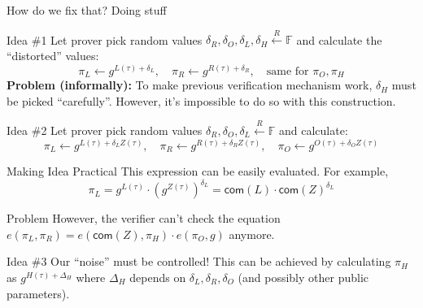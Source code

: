 \documentclass{zkdl-presentation-template}
\begin{document}
    \begin{frame}{How do we fix that? Doing stuff}
        \begin{block}{Idea \#1}
            Let prover pick random values $\delta_R, \delta_O, \delta_L, \delta_H \xleftarrow{R} \mathbb{F}$ and calculate the ``distorted'' values:
            \begin{equation*}
                \pi_L \gets g^{L(\tau) + \delta_L}, \quad \pi_R \gets g^{R(\tau) + \delta_R}, \quad \text{same for $\pi_O, \pi_H$}
            \end{equation*}
            \pause\textbf{Problem (informally):} To make previous verification mechanism work, $\delta_H$ must be picked ``carefully''. However, it's impossible to do so with this construction.\pause
        \end{block}

        \begin{block}{Idea \#2}
            Let prover pick random values $\delta_R, \delta_O, \delta_L \xleftarrow{R} \mathbb{F}$ and calculate:
            \begin{equation*}
                \pi_L \gets g^{L(\tau) + \delta_L Z(\tau)}, \quad \pi_R \gets g^{R(\tau) + \delta_R Z(\tau)}, \quad \pi_O \gets g^{O(\tau) + \delta_O Z(\tau)}
            \end{equation*}
        \end{block}
    \end{frame}

    \begin{frame}{Making Idea Practical}
        This expression can be easily evaluated. For example,
        \begin{equation*}
            \pi_L = g^{L(\tau)} \cdot \left(g^{Z(\tau)}\right)^{\delta_L} = \mathsf{com}(L) \cdot \mathsf{com}(Z)^{\delta_L}
        \end{equation*}

        \pause\begin{alertblock}{Problem}
            However, the verifier can't check the equation $e(\pi_L, \pi_R) = e(\mathsf{com}(Z), \pi_H) \cdot e(\pi_O, g)$ anymore. \pause
        \end{alertblock}

        \begin{block}{Idea \#3}
            Our ``noise'' must be controlled! This can be achieved by calculating $\pi_H$ as $g^{H(\tau) + \Delta_H}$ where $\Delta_H$ depends on $\delta_L, \delta_R, \delta_O$ (and possibly other public parameters).    
        \end{block}
    \end{frame}
\end{document}
